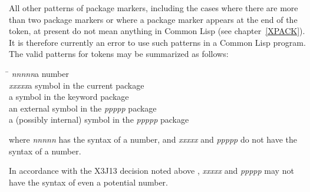 All other patterns of package markers,
including the cases where there are more than two
package markers or where a package marker appears at the end of the token,
at present do not mean anything in Common Lisp (see chapter~\ref{XPACK}).
It is therefore currently an error to use such patterns in a Common Lisp program.
The valid patterns for tokens may be summarized as follows:
\begin{tabbing}
\hskip 8pc\=\kill
\emph{nnnnn}\>a number \\
\emph{xxxxx}\>a symbol in the current package \\
\>a symbol in the keyword package \\
\>an external symbol in the \emph{ppppp} package \\
\>a (possibly internal) symbol in the \emph{ppppp} package
\end{tabbing}
where \emph{nnnnn} has the syntax of a number, and \emph{xxxxx} and \emph{ppppp} do
not have the syntax of a number.

\begin{new}
In accordance with the X3J13 decision noted above
, \emph{xxxxx} and \emph{ppppp} may not have the syntax of even
a potential number.
\end{new}

